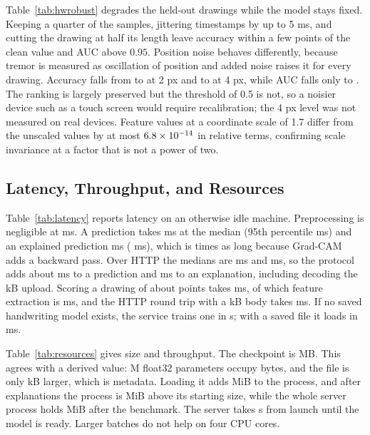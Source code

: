 \documentclass[conference]{IEEEtran}
\begin{document}
Table~\ref{tab:hwrobust} degrades the held-out drawings while the model stays fixed. Keeping a quarter of the samples, jittering timestamps by up to 5 ms, and cutting the drawing at half its length leave accuracy within a few points of the clean value and AUC above $0.95$. Position noise behaves differently, because tremor is measured as oscillation of position and added noise raises it for every drawing. Accuracy falls from \HwAcc{} to \HwNoiseTwoAcc{} at 2 px and to \HwNoiseFourAcc{} at 4 px, while AUC falls only to \HwNoiseFourAuc{}. The ranking is largely preserved but the threshold of 0.5 is not, so a noisier device such as a touch screen would require recalibration; the 4 px level was not measured on real devices. Feature values at a coordinate scale of 1.7 differ from the unscaled values by at most \(6.8\times10^{-14}\) in relative terms, confirming scale invariance at a factor that is not a power of two.



\subsection{Latency, Throughput, and Resources}
Table~\ref{tab:latency} reports latency on an otherwise idle machine. Preprocessing is negligible at \PreprocMedian{} ms. A prediction takes \PredictMedian{} ms at the median (95th percentile \PredictPNinetyFive{} ms) and an explained prediction \ExplainMedian{} ms (\ExplainPNinetyFive{} ms), which is \ExplainRatio{} times as long because Grad-CAM adds a backward pass. Over HTTP the medians are \HttpPredictMedian{} ms and \HttpExplainMedian{} ms, so the protocol adds about \HttpPredOverhead{} ms to a prediction and \HttpExpOverhead{} ms to an explanation, including decoding the \PngKb{} kB upload. Scoring a drawing of about \HwPoints{} points takes \HwAnalyzeMedian{} ms, of which feature extraction is \HwFeatMedian{} ms, and the HTTP round trip with a \HwJsonKb{} kB body takes \HttpHwMedian{} ms. If no saved handwriting model exists, the service trains one in \HwTrainS{} s; with a saved file it loads in \HwLoadMs{} ms.



Table~\ref{tab:resources} gives size and throughput. The checkpoint is \CkptMb{} MB. This agrees with a derived value: \ParamsTotalM{} M float32 parameters occupy \CkptBytes{} bytes, and the file is only \CkptKb{} kB larger, which is metadata. Loading it adds \RssAfterLoad{} MiB to the process, and after explanations the process is \RssAfterExplain{} MiB above its starting size, while the whole server process holds \ServerRssMb{} MiB after the benchmark. The server takes \ServerColdS{} s from launch until the model is ready. Larger batches do not help on four CPU cores.
\end{document}
